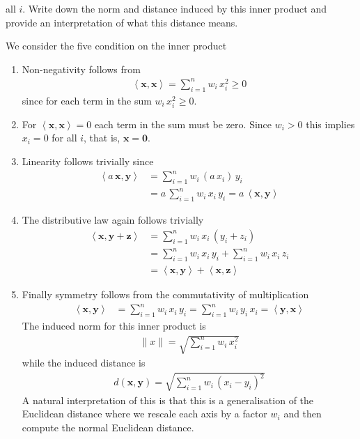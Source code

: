 \documentclass{sotonExamBoxes}    %
\newcommand{\len}[1]{\| #1 \|}
\newcommand{\inner}[2]{\left\langle #1, #2\right\rangle}
\begin{document}
\begin{question}{20}
\begin{qparts}
{      all $i$.  Write down the norm and distance induced by this
      inner product and provide an interpretation of what this
      distance means.}{}
    \begin{answer}
      We consider the five condition on the inner product
      \begin{enumerate}
      \item Non-negativity follows from
        \begin{align*}
          \inner{\bm{x}}{\bm{x}} = \sum_{i=1}^n w_i \, x_i ^2
          \geq 0
        \end{align*}
        since for each term in the sum $w_i \, x_i ^2\geq0$.
      \item For $ \inner{\bm{x}}{\bm{x}} = 0$ each term in the sum
        must be zero.  Since $w_i>0$ this implies $x_i=0$ for all $i$,
        that is, $\bm{x}=\bm{0}$.
      \item Linearity follows trivially since
        \begin{align*}
          \inner{a\,\bm{x}}{\bm{y}}
          &= \sum_{i=1}^n w_i \, (a\,x_i)  \,y_i \\
          &= a\, \sum_{i=1}^n w_i \, x_i \,y_i = a\,\inner{\bm{x}}{\bm{y}}
        \end{align*}
      \item The distributive law again follows trivially
        \begin{align*}
          \inner{\bm{x}}{\bm{y}+\bm{z}}
          &= \sum_{i=1}^n w_i \, x_i \,(y_i+z_i) \\
          &= \sum_{i=1}^n w_i \, x_i \,y_i + \sum_{i=1}^n w_i \, x_i \,z_i 
          \\
          &=   \inner{\bm{x}}{\bm{y}} +   \inner{\bm{x}}{\bm{z}}
        \end{align*}
      \item Finally symmetry follows from the commutativity of
        multiplication
        \begin{align*}
          \inner{\bm{x}}{\bm{y}} &=  \sum_{i=1}^n w_i \, x_i \,y_i
          =  \sum_{i=1}^n w_i \, y_i \,x_i =  \inner{\bm{y}}{\bm{x}} 
        \end{align*}
        The induced norm for this inner product is
        \begin{align*}
          \len{x} = \sqrt{\sum_{i=1}^n w_i \, x_i^2}
        \end{align*}
        while the induced distance is
        \begin{align*}
          d(\bm{x}, \bm{y}) = \sqrt{ \sum_{i=1}^n w_i \, (x_i-y_i)^2}
        \end{align*}
        A natural interpretation of this is that this is a
        generalisation of the Euclidean distance where we rescale each
        axis by a factor $w_i$ and then compute the normal Euclidean distance.
      \end{enumerate}
    \end{answer}
  \end{qparts}
  
\end{question}




\end{document}
